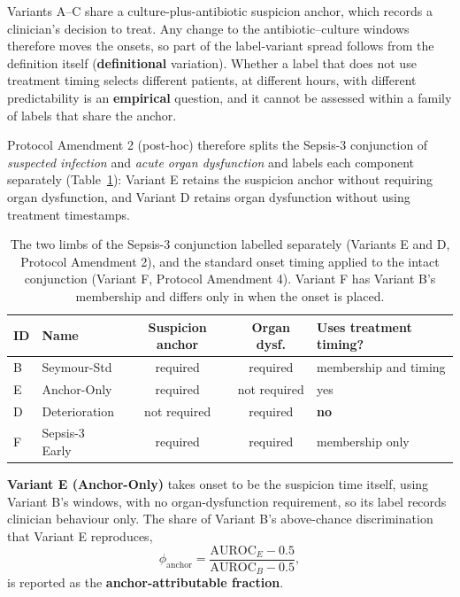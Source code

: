 Variants A--C share a culture-plus-antibiotic suspicion anchor, which records a
clinician's decision to treat. Any change to the antibiotic--culture windows
therefore moves the onsets, so part of the label-variant spread follows from
the definition itself (\textbf{definitional} variation). Whether a label that
does not use treatment timing selects different patients, at different hours,
with different predictability is an \textbf{empirical} question, and it cannot
be assessed within a family of labels that share the anchor.

Protocol Amendment 2 (post-hoc) therefore splits the Sepsis-3 conjunction of
\emph{suspected infection} and \emph{acute organ dysfunction} and labels each
component separately (Table~\ref{tab:alt_label_variants}): Variant E retains
the suspicion anchor without requiring organ dysfunction, and Variant D retains
organ dysfunction without using treatment timestamps.

\begin{table}[H]
    \centering\small
    \begin{tabular}{llccp{3.1cm}}
        \toprule
        \textbf{ID} & \textbf{Name} & \textbf{Suspicion anchor}
        & \textbf{Organ dysf.} & \textbf{Uses treatment timing?} \\
        \midrule
        B & Seymour-Std    & required     & required     & \raggedright membership and timing\tabularnewline
        E & Anchor-Only    & required     & not required & \raggedright yes\tabularnewline
        D & Deterioration  & not required & required     & \raggedright \textbf{no}\tabularnewline
        F & Sepsis-3 Early & required     & required     & \raggedright membership only\tabularnewline
        \bottomrule
    \end{tabular}
    \caption{The two limbs of the Sepsis-3 conjunction labelled separately
    (Variants E and D, Protocol Amendment 2), and the standard onset timing
    applied to the intact conjunction (Variant F, Protocol Amendment 4).
    Variant F has Variant B's membership and differs only in when the onset is
    placed.}
    \label{tab:alt_label_variants}
\end{table}

\textbf{Variant E (Anchor-Only)} takes onset to be the suspicion time itself,
using Variant B's windows, with no organ-dysfunction requirement, so its label
records clinician behaviour only. The share of Variant B's above-chance
discrimination that Variant E reproduces,
\begin{equation}
    \phi_{\text{anchor}}
    = \frac{\mathrm{AUROC}_E - 0.5}{\mathrm{AUROC}_B - 0.5},
    \label{eq:anchor_fraction}
\end{equation}
is reported as the \textbf{anchor-attributable fraction}.

